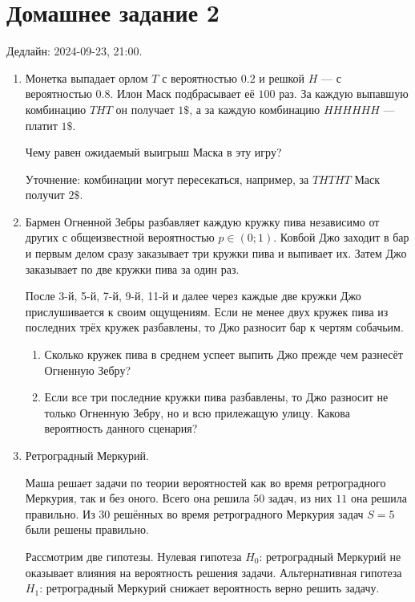 \documentclass[12pt]{article}
\begin{document}
\section*{Домашнее задание 2}

Дедлайн: 2024-09-23, 21:00.

\begin{enumerate}
\item Монетка выпадает орлом $T$ с вероятностью $0.2$ и решкой $H$ — с вероятностью $0.8$.
Илон Маск подбрасывает её $100$ раз. 
За каждую выпавшую комбинацию $THT$ он получает $1\$$, а за каждую комбинацию $HHHHHH$ — платит $1\$$.

Чему равен ожидаемый выигрыш Маска в эту игру?

Уточнение: комбинации могут пересекаться, например, за $THTHT$ Маск получит $2\$$.

\item Бармен Огненной Зебры разбавляет каждую кружку пива независимо от других с общеизвестной вероятностью $p \in (0;1)$.
Ковбой Джо заходит в бар и первым делом сразу заказывает три кружки пива и выпивает их.
Затем Джо заказывает по две кружки пива за один раз. 

После 3-й, 5-й, 7-й, 9-й, 11-й и далее через каждые две кружки Джо прислушивается к своим ощущениям.
Если не менее двух кружек пива из последних трёх кружек разбавлены, то Джо разносит бар к чертям собачьим. 

\begin{enumerate}
    \item Сколько кружек пива в среднем успеет выпить Джо прежде чем разнесёт Огненную Зебру?
    \item Если все три последние кружки пива разбавлены, то Джо разносит не только Огненную Зебру, 
    но и всю прилежащую улицу. Какова вероятность данного сценария?
\end{enumerate}


\item Ретроградный Меркурий. 

Маша решает задачи по теории вероятностей как во время ретроградного Меркурия, так и без оного. 
Всего она решила $50$ задач, из них $11$ она решила правильно. 
Из $30$ решённых во время ретроградного Меркурия задач $S = 5$ были решены правильно. 

Рассмотрим две гипотезы. 
Нулевая гипотеза $H_0$: ретроградный Меркурий не оказывает влияния на вероятность решения задачи.
Альтернативная гипотеза $H_1$: ретроградный Меркурий снижает вероятность верно решить задачу. 



\end{enumerate}
\end{document}

